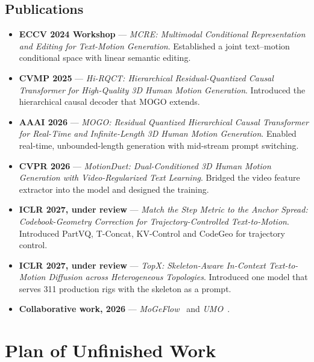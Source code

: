\documentclass[11pt,a4paper]{report}
\begin{document}
\section{Publications}

\begin{itemize}
\item \textbf{ECCV 2024 Workshop} --- \emph{MCRE: Multimodal Conditional
  Representation and Editing for Text-Motion Generation}.
  Established a joint text--motion conditional space with linear
  semantic editing.

\item \textbf{CVMP 2025} --- \emph{Hi-RQCT: Hierarchical Residual-Quantized
  Causal Transformer for High-Quality 3D Human Motion Generation}. Introduced the
  hierarchical causal decoder that MOGO extends.

\item \textbf{AAAI 2026} --- \emph{MOGO: Residual Quantized Hierarchical Causal
  Transformer for Real-Time and Infinite-Length 3D Human Motion Generation}.
  Enabled real-time, unbounded-length generation with
  mid-stream prompt switching.

\item \textbf{CVPR 2026} --- \emph{MotionDuet: Dual-Conditioned 3D Human Motion
  Generation with Video-Regularized Text Learning}. Bridged the
  video feature extractor into the model and designed the training.

\item \textbf{ICLR 2027, under review} --- \emph{Match the Step Metric to the
  Anchor Spread: Codebook-Geometry Correction for Trajectory-Controlled
  Text-to-Motion}. Introduced PartVQ, T-Concat, KV-Control and
  CodeGeo for trajectory control.

\item \textbf{ICLR 2027, under review} --- \emph{TopX: Skeleton-Aware
  In-Context Text-to-Motion Diffusion across Heterogeneous Topologies}.
  Introduced one model that serves 311 production rigs with the skeleton
  as a prompt.

\item \textbf{Collaborative work, 2026} ---
  \emph{MoGeFlow}~\cite{fang2026mogeflow} and
  \emph{UMO}~\cite{zhan2026umo}.
\end{itemize}

\chapter{Plan of Unfinished Work}
\end{document}

